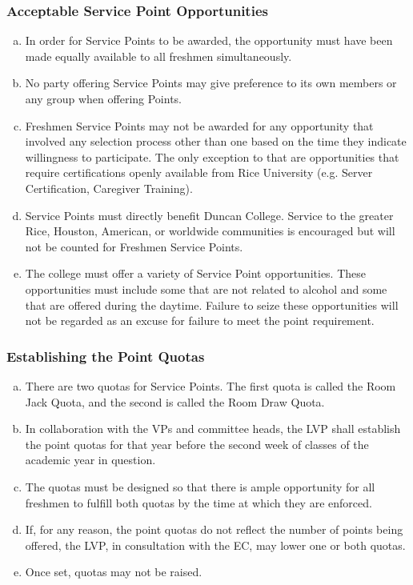 \documentclass[USletter,12pt]{article}
\begin{document}
\begin{enumerate}[(a)]
\subsubsection{Acceptable Service Point Opportunities}
\begin{enumerate}[(a)]
\item In order for Service Points to be awarded, the opportunity must have been made equally available to all freshmen simultaneously.
\item No party offering Service Points may give preference to its own members or any group when offering Points.
\item Freshmen Service Points may not be awarded for any opportunity that involved any selection process other than one based on the time they indicate willingness to participate.  The only exception to that are opportunities that require certifications openly available from Rice University (e.g. Server Certification, Caregiver Training). 
\item Service Points must directly benefit Duncan College. Service to the greater Rice, Houston, American, or worldwide communities is encouraged but will not be counted for Freshmen Service Points.
\item The college must offer a variety of Service Point opportunities. These opportunities must include some that are not related to alcohol and some that are offered during the daytime. Failure to seize these opportunities will not be regarded as an excuse for failure to meet the point requirement.
\end{enumerate}

\subsubsection{Establishing the Point Quotas}
\begin{enumerate}[(a)]
\item There are two quotas for Service Points.  The first quota is called the Room Jack Quota, and the second is called the Room Draw Quota.
\item In collaboration with the VPs and committee heads, the LVP shall establish the point quotas for that year before the second week of classes of the academic year in question.
\item The quotas must be designed so that there is ample opportunity for all freshmen to fulfill both quotas by the time at which they are enforced.
\item If, for any reason, the point quotas do not reflect the number of points being offered, the LVP, in consultation with the EC, may lower one or both quotas.
\item Once set, quotas may not be raised.
\end{enumerate}


\end{enumerate}
\end{document}
